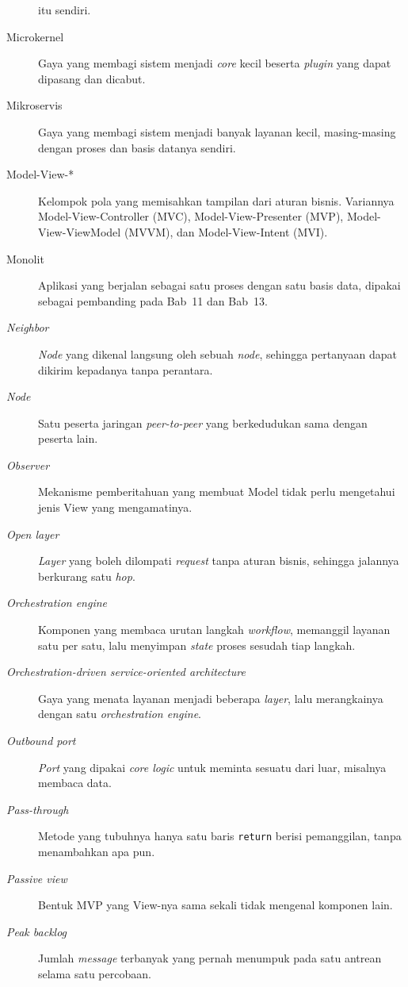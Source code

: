 \begin{description}
    itu sendiri.
  \item[Microkernel] Gaya yang membagi sistem menjadi \textit{core} kecil
    beserta \textit{plugin} yang dapat dipasang dan dicabut.
  \item[Mikroservis] Gaya yang membagi sistem menjadi banyak layanan kecil,
    masing-masing dengan proses dan basis datanya sendiri.
  \item[Model-View-*] Kelompok pola yang memisahkan tampilan dari aturan bisnis.
    Variannya Model-View-Controller (MVC), Model-View-Presenter (MVP),
    Model-View-ViewModel (MVVM), dan Model-View-Intent (MVI).
  \item[Monolit] Aplikasi yang berjalan sebagai satu proses dengan satu basis
    data, dipakai sebagai pembanding pada Bab~11 dan Bab~13.
  \item[\textit{Neighbor}] \textit{Node} yang dikenal langsung oleh sebuah
    \textit{node}, sehingga pertanyaan dapat dikirim kepadanya tanpa perantara.
  \item[\textit{Node}] Satu peserta jaringan \textit{peer-to-peer} yang
    berkedudukan sama dengan peserta lain.
  \item[\textit{Observer}] Mekanisme pemberitahuan yang membuat Model tidak perlu
    mengetahui jenis View yang mengamatinya.
  \item[\textit{Open layer}] \textit{Layer} yang boleh dilompati \textit{request}
    tanpa aturan bisnis, sehingga jalannya berkurang satu \textit{hop}.
  \item[\textit{Orchestration engine}] Komponen yang membaca urutan langkah
    \textit{workflow}, memanggil layanan satu per satu, lalu menyimpan
    \textit{state} proses sesudah tiap langkah.
  \item[\textit{Orchestration-driven service-oriented architecture}] Gaya yang
    menata layanan menjadi beberapa \textit{layer}, lalu merangkainya dengan
    satu \textit{orchestration engine}.
  \item[\textit{Outbound port}] \textit{Port} yang dipakai \textit{core logic}
    untuk meminta sesuatu dari luar, misalnya membaca data.
  \item[\textit{Pass-through}] Metode yang tubuhnya hanya satu baris
    \texttt{return} berisi pemanggilan, tanpa menambahkan apa pun.
  \item[\textit{Passive view}] Bentuk MVP yang View-nya sama sekali tidak
    mengenal komponen lain.
  \item[\textit{Peak backlog}] Jumlah \textit{message} terbanyak yang
    pernah menumpuk pada satu antrean selama satu percobaan.

\end{description}
